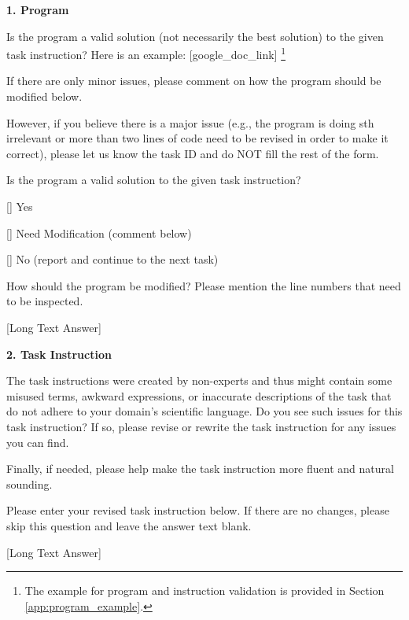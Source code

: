 \begin{tcolorbox}
\textbf{1. Program}

Is the program a valid solution (not necessarily the best solution) to the given task instruction? Here is an example: [google\_doc\_link] \footnote{The example for program and instruction validation is provided in Section \ref{app:program_example}.}

If there are only minor issues, please comment on how the program should be modified below. 

However, if you believe there is a major issue (e.g., the program is doing sth irrelevant or more than two lines of code need to be revised in order to make it correct), please let us know the task ID and do NOT fill the rest of the form.

Is the program a valid solution to the given task instruction?

[] Yes

[] Need Modification (comment below)

[] No (report and continue to the next task)

How should the program be modified? Please mention the line numbers that need to be inspected.

[Long Text Answer]

\textbf{2. Task Instruction}

The task instructions were created by non-experts and thus might contain some misused terms,  awkward expressions, or inaccurate descriptions of the task that do not adhere to your domain’s scientific language. Do you see such issues for this task instruction? If so, please revise or rewrite the task instruction for any issues you can find.

Finally, if needed, please help make the task instruction more fluent and natural sounding. 

Please enter your revised task instruction below. If there are no changes, please skip this question and leave the answer text blank. 

[Long Text Answer]
\end{tcolorbox}

